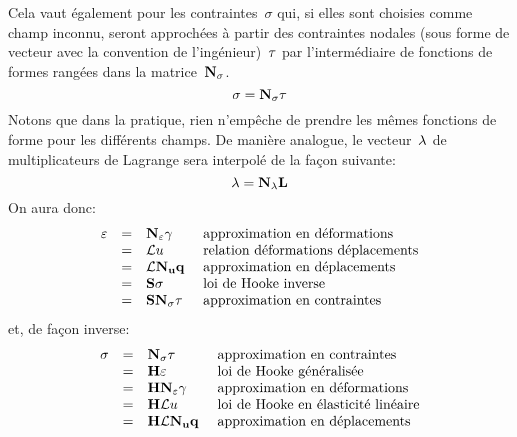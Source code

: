 Cela vaut également pour les contraintes~$\sigma$ qui, si elles sont choisies comme champ inconnu, seront approchées à partir des contraintes nodales (sous forme de vecteur avec la convention de l'ingénieur)~$\VV{\tau}$ par l'intermédiaire de fonctions de formes rangées dans la matrice~$\MM{N_\sigma}$.
\begin{equation}
  \sigma = \MM{N_\sigma}\VV{\tau}
\end{equation}
Notons que dans la pratique, rien n'empêche de prendre les mêmes fonctions de forme pour les différents champs.
\medskipvm
De manière analogue, le vecteur~$\VV{\lambda}$ de multiplicateurs de Lagrange sera interpolé de la façon suivante:
\begin{equation}
  \VV{\lambda}=\MM{N_\lambda}\VV{L}
\end{equation}
\medskipvm
On aura donc:
\begin{equation}
  \begin{array}{rcll}
  \varepsilon &=& \MM{N_\varepsilon}\VV{\gamma}
           &\text{ approximation en déformations}\\
          &=& \MM{\cL}u
           &\text{ relation déformations déplacements}\\
          &=& \MM{\cL}\MM{N_u}\VV{q}
           &\text{ approximation en déplacements}\\
          &=& \MM{S}\sigma
           &\text{ loi de Hooke inverse}\\
          &=& \MM{S}\MM{N_\sigma}\VV{\tau}
           &\text{ approximation en contraintes}
  \end{array}
\end{equation}
et, de façon inverse:
\begin{equation}
  \begin{array}{rcll}
  \sigma &=& \MM{N_\sigma}\VV{\tau}
           &\text{ approximation en contraintes}\\
          &=& \MM{H}\varepsilon
           &\text{ loi de Hooke généralisée}\\
          &=& \MM{H}\MM{N_\varepsilon}\VV{\gamma}
           &\text{ approximation en déformations}\\
          &=& \MM{H}\MM{\cL}u
           &\text{ loi de Hooke en élasticité linéaire}\\
          &=& \MM{H}\MM{\cL}\MM{N_u}\VV{q}
           &\text{ approximation en déplacements}
  \end{array}
\end{equation}
